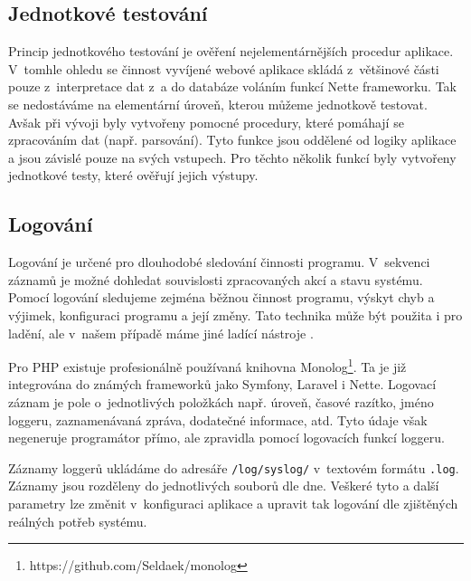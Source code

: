 \documentclass[czech,BP]{thesiskiv}
\begin{document}
		\subsection{Jednotkové testování}
		\par Princip jednotkového testování je ověření nejelementárnějších procedur aplikace. V~tomhle ohledu se činnost vyvíjené webové aplikace skládá z~většinové části pouze z~interpretace dat z~a do databáze voláním funkcí Nette frameworku. Tak se nedostáváme na elementární úroveň, kterou můžeme jednotkově testovat. Avšak při vývoji byly vytvořeny pomocné procedury, které pomáhají se zpracováním dat (např. parsování). Tyto funkce jsou oddělené od logiky aplikace a jsou závislé pouze na svých vstupech. Pro těchto několik funkcí byly vytvořeny jednotkové testy, které ověřují jejich výstupy.
		
		\subsection{Logování}
		\par Logování je určené pro dlouhodobé sledování činnosti programu. V~sekvenci záznamů je možné dohledat souvislosti zpracovaných akcí a stavu systému. Pomocí logování sledujeme zejména běžnou činnost programu, výskyt chyb a výjimek, konfiguraci programu a její změny. Tato technika může být použita i pro ladění, ale v~našem případě máme jiné ladící nástroje \cite{OKSPrednasky}.
		\par Pro PHP existuje profesionálně používaná knihovna Monolog\footnote{https://github.com/Seldaek/monolog}. Ta je již integrována do známých frameworků jako Symfony, Laravel i Nette. Logovací záznam je pole o~jednotlivých položkách např. úroveň, časové razítko, jméno loggeru, zaznamenávaná zpráva, dodatečné informace, atd. Tyto údaje však negeneruje programátor přímo, ale zpravidla pomocí logovacích funkcí loggeru.
		\par Záznamy loggerů ukládáme do adresáře \texttt{/log/syslog/} v~textovém formátu \texttt{.log}. Záznamy jsou rozděleny do jednotlivých souborů dle dne. Veškeré tyto a další parametry lze změnit v~konfiguraci aplikace a upravit tak logování dle zjištěných reálných potřeb systému.
		
\end{document}
